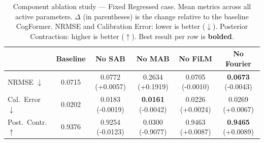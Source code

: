 \begin{table}[t]
\centering
\caption{Component ablation study — Fixed Regressed case. Mean metrics across
all active parameters. $\Delta$ (in parentheses) is the change relative to the
baseline CogFormer. NRMSE and Calibration Error: lower is better ($\downarrow$).
Posterior Contraction: higher is better ($\uparrow$). Best result per row is
\textbf{bolded}.}
\label{tab:component_ablation_fixed_regressed}
\begin{tabular}{lccccc}
\toprule
 & Baseline & No SAB & No MAB & No FiLM & No Fourier \\
\midrule
NRMSE $\downarrow$ & 0.0715 & 0.0772 \small{(+0.0057)} & 0.2634 \small{(+0.1919)} & 0.0705 \small{(-0.0010)} & \textbf{0.0673} \small{(-0.0043)} \\
Cal.\ Error $\downarrow$ & 0.0202 & 0.0183 \small{(-0.0019)} & \textbf{0.0161} \small{(-0.0042)} & 0.0226 \small{(+0.0024)} & 0.0269 \small{(+0.0067)} \\
Post.\ Contr. $\uparrow$ & 0.9376 & 0.9254 \small{(-0.0123)} & 0.0300 \small{(-0.9077)} & 0.9463 \small{(+0.0087)} & \textbf{0.9465} \small{(+0.0089)} \\
\bottomrule
\end{tabular}
\end{table}